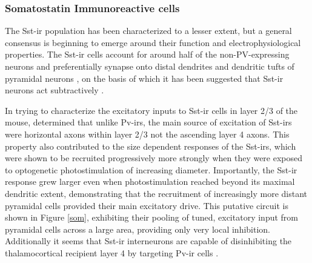 \subsubsection{Somatostatin Immunoreactive cells}

The Sst-ir population has been characterized to a lesser extent, but a
general consensus is beginning to emerge around their function and
electrophysiological properties. The Sst-ir cells account for around
half of the non-PV-expressing neurons \citep{Gonchar2007,Xu2010} and
preferentially synapse onto distal dendrites and dendritic tufts of
pyramidal neurons \citep{DiCristo2004,Silberberg2007}, on the basis of
which it has been suggested that Sst-ir neurons act subtractively
\citep{Wilson2012}.

In trying to characterize the excitatory inputs to Sst-ir cells in
layer 2/3 of the mouse, \cite{Xu2009} determined that unlike Pv-irs,
the main source of excitation of Sst-irs were horizontal axons within
layer 2/3 not the ascending layer 4 axons. This property also
contributed to the size dependent responses of the Sst-irs, which were
shown to be recruited progressively more strongly when they were
exposed to optogenetic photostimulation of increasing
diameter. Importantly, the Sst-ir response grew larger even when
photostimulation reached beyond its maximal dendritic extent,
demonstrating that the recruitment of increasingly more distant
pyramidal cells provided their main excitatory drive. This putative
circuit is shown in Figure \ref{som}, exhibiting their pooling of
tuned, excitatory input from pyramidal cells across a large area,
providing only very local inhibition. Additionally it seems that
Sst-ir interneurons are capable of disinhibiting the thalamocortical
recipient layer 4 by targeting Pv-ir cells \citep{Xu2013}.

